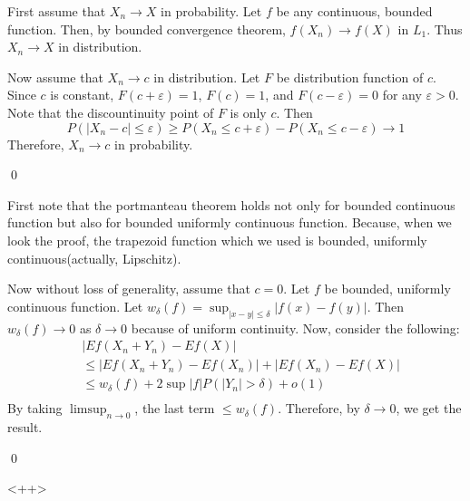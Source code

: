 \begin{problem}[3.2.12] \hfill

	First assume that $X_n \rightarrow X$ in probability.
	Let $f$ be any continuous, bounded function.
	Then, by bounded convergence theorem, $f(X_n) \rightarrow f(X)$ in $L_1$.
	Thus $X_n \rightarrow X$ in distribution.

	Now assume that $X_n \rightarrow c$ in distribution.
	Let $F$ be distribution function of $c$.
	Since $c$ is constant, $F(c + \varepsilon) = 1$, $F(c) = 1$, and $F(c-\varepsilon) = 0$ for any $\varepsilon>0$.
	Note that the discountinuity point of $F$ is only $c$.
	Then 
	\[
		P(|X_n - c| \leq \varepsilon) \geq P(X_n \leq c+\varepsilon) - P(X_n \leq c -\varepsilon) \rightarrow 1
	\]
	Therefore, $X_n \rightarrow c$ in probability.

	\qed
\end{problem}

\begin{problem} \hfill

	First note that the portmanteau theorem holds not only for bounded continuous function but also for bounded uniformly continuous function.
	Because, when we look the proof, the trapezoid function which we used is bounded, uniformly continuous(actually, Lipschitz). 

	Now without loss of generality, assume that $c = 0$.
	Let $f$ be bounded, uniformly continuous function.
	Let $w_\delta (f) = \sup_{|x-y| \leq \delta} |f(x) - f(y)|$.
	Then $w_\delta (f) \rightarrow 0$ as $\delta \rightarrow 0$ because of uniform continuity.
	Now, consider the following:
	\[
		\begin{split}
			& \left | Ef(X_n + Y_n) - Ef(X) \right | \\
			& \leq \left | Ef(X_n + Y_n) - Ef(X_n) \right | + \left | Ef(X_n) - Ef(X) \right | \\
			& \leq w_\delta (f) + 2\sup |f| P(|Y_n| > \delta) + o(1) \\
		\end{split}
	\]
	By taking $\limsup_{n\rightarrow 0}$, the last term $\leq w_\delta (f)$.
	Therefore, by $\delta \rightarrow 0$, we get the result.

	\qed
\end{problem}

\begin{problem}[3.2.14] \hfill


	
\end{problem}<++>
